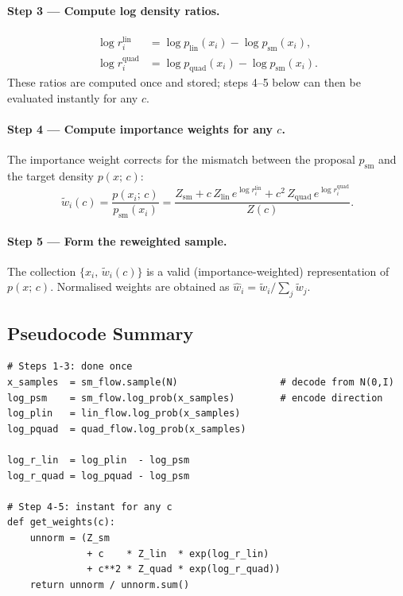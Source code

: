 \documentclass[11pt, a4paper]{article}
\begin{document}
\paragraph{Step 3 — Compute log density ratios.}
\begin{align}
    \log r^\mathrm{lin}_i  &= \log p_\mathrm{lin}(x_i)  - \log p_\mathrm{sm}(x_i), \\
    \log r^\mathrm{quad}_i &= \log p_\mathrm{quad}(x_i) - \log p_\mathrm{sm}(x_i).
\end{align}
These ratios are computed once and stored; steps 4--5 below can then be evaluated
instantly for any $c$.

\paragraph{Step 4 — Compute importance weights for any $c$.}
The importance weight corrects for the mismatch between the proposal $p_\mathrm{sm}$
and the target density $p(x;\, c)$:
\begin{equation}
    \tilde{w}_i(c)
    = \frac{p(x_i;\, c)}{p_\mathrm{sm}(x_i)}
    = \frac{Z_\mathrm{sm}
            + c\, Z_\mathrm{lin}\, e^{\log r^\mathrm{lin}_i}
            + c^2\, Z_\mathrm{quad}\, e^{\log r^\mathrm{quad}_i}}
           {Z(c)}.
    \label{eq:importance_weight}
\end{equation}

\paragraph{Step 5 — Form the reweighted sample.}
The collection $\{x_i,\, \tilde{w}_i(c)\}$ is a valid (importance-weighted)
representation of $p(x;\, c)$.
Normalised weights are obtained as $\hat{w}_i = \tilde{w}_i / \sum_j \tilde{w}_j$.

\subsection{Pseudocode Summary}

\begin{lstlisting}
# Steps 1-3: done once
x_samples  = sm_flow.sample(N)                  # decode from N(0,I)
log_psm    = sm_flow.log_prob(x_samples)        # encode direction
log_plin   = lin_flow.log_prob(x_samples)
log_pquad  = quad_flow.log_prob(x_samples)

log_r_lin  = log_plin  - log_psm
log_r_quad = log_pquad - log_psm

# Step 4-5: instant for any c
def get_weights(c):
    unnorm = (Z_sm
              + c    * Z_lin  * exp(log_r_lin)
              + c**2 * Z_quad * exp(log_r_quad))
    return unnorm / unnorm.sum()
\end{lstlisting}
\end{document}
